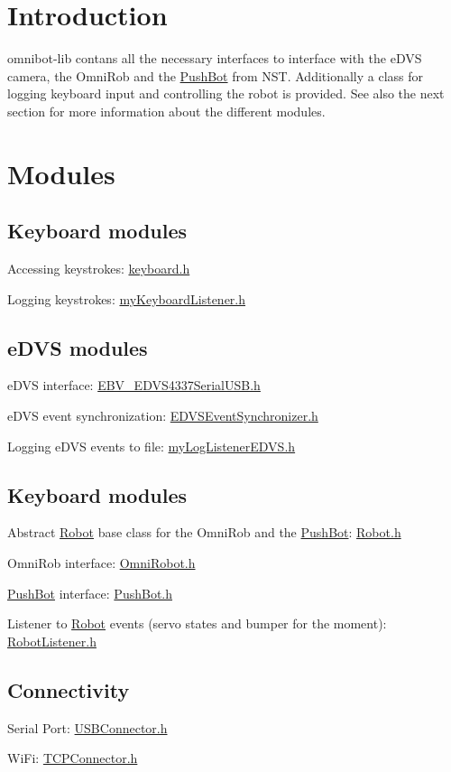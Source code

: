 \hypertarget{index_intro_sec}{}\section{Introduction}\label{index_intro_sec}
omnibot-\/lib contans all the necessary interfaces to interface with the e\+D\+V\+S camera, the Omni\+Rob and the \hyperlink{class_push_bot}{Push\+Bot} from N\+S\+T. Additionally a class for logging keyboard input and controlling the robot is provided. See also the next section for more information about the different modules.\hypertarget{index_modules_sec}{}\section{Modules}\label{index_modules_sec}
\hypertarget{index_keyboard_sec}{}\subsection{Keyboard modules}\label{index_keyboard_sec}
Accessing keystrokes\+: \hyperlink{keyboard_8h}{keyboard.\+h}

Logging keystrokes\+: \hyperlink{my_keyboard_listener_8h}{my\+Keyboard\+Listener.\+h}\hypertarget{index_eDVS_sec}{}\subsection{e\+D\+V\+S modules}\label{index_eDVS_sec}
e\+D\+V\+S interface\+: \hyperlink{_e_b_v___e_d_v_s4337_serial_u_s_b_8h}{E\+B\+V\+\_\+\+E\+D\+V\+S4337\+Serial\+U\+S\+B.\+h}

e\+D\+V\+S event synchronization\+: \hyperlink{_e_d_v_s_event_synchronizer_8h_source}{E\+D\+V\+S\+Event\+Synchronizer.\+h}

Logging e\+D\+V\+S events to file\+: \hyperlink{my_log_listener_e_d_v_s_8h}{my\+Log\+Listener\+E\+D\+V\+S.\+h}\hypertarget{index_keyboard_sec}{}\subsection{Keyboard modules}\label{index_keyboard_sec}
Abstract \hyperlink{class_robot}{Robot} base class for the Omni\+Rob and the \hyperlink{class_push_bot}{Push\+Bot}\+: \hyperlink{_robot_8h_source}{Robot.\+h}

Omni\+Rob interface\+: \hyperlink{_omni_robot_8h}{Omni\+Robot.\+h}

\hyperlink{class_push_bot}{Push\+Bot} interface\+: \hyperlink{_push_bot_8h}{Push\+Bot.\+h}

Listener to \hyperlink{class_robot}{Robot} events (servo states and bumper for the moment)\+: \hyperlink{_robot_listener_8h}{Robot\+Listener.\+h}\hypertarget{index_connectivity_sec_sec}{}\subsection{Connectivity}\label{index_connectivity_sec_sec}
Serial Port\+: \hyperlink{_u_s_b_connector_8h}{U\+S\+B\+Connector.\+h}

Wi\+Fi\+: \hyperlink{_t_c_p_connector_8h}{T\+C\+P\+Connector.\+h} 